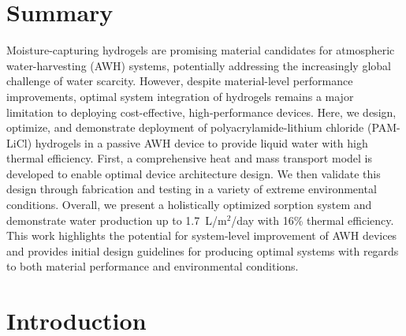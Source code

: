 \documentclass[11pt]{article}
\begin{document}
\section*{Summary}
Moisture-capturing hydrogels are promising material candidates for atmospheric water-harvesting (AWH) systems, potentially addressing the increasingly global challenge of water scarcity. However, despite material-level performance improvements, optimal system integration of hydrogels remains a major limitation to deploying cost-effective, high-performance devices. Here, we design, optimize, and demonstrate deployment of polyacrylamide-lithium chloride (PAM-LiCl) hydrogels in a passive AWH device to provide liquid water with high thermal efficiency. First, a comprehensive heat and mass transport model is developed to enable optimal device architecture design. We then validate this design through fabrication and testing in a variety of extreme environmental conditions. Overall, we present a holistically optimized sorption system and demonstrate water production up to 1.7~L/m$^2$/day with 16\% thermal efficiency. This work highlights the potential for system-level improvement of AWH devices and provides initial design guidelines for producing optimal systems with regards to both material performance and environmental conditions.

\section{Introduction}
\end{document}
